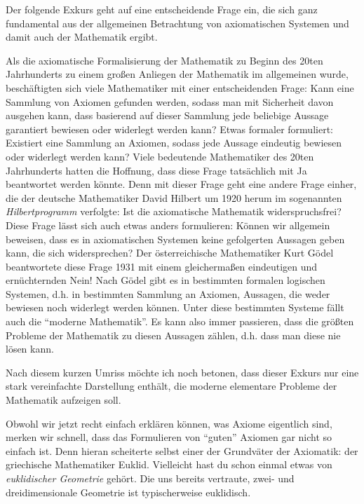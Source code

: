Der folgende Exkurs geht auf eine entscheidende Frage ein, die sich ganz fundamental aus der allgemeinen Betrachtung von axiomatischen Systemen und damit auch der Mathematik ergibt. 

\begin{exkurs}
    Als die axiomatische Formalisierung der Mathematik zu Beginn des 20ten Jahrhunderts zu einem großen Anliegen der Mathematik im allgemeinen wurde, beschäftigten sich viele Mathematiker mit einer entscheidenden Frage: Kann eine Sammlung von Axiomen gefunden werden, sodass man mit Sicherheit davon ausgehen kann, dass basierend auf dieser Sammlung jede beliebige Aussage garantiert bewiesen oder widerlegt werden kann? Etwas formaler formuliert: Existiert eine Sammlung an Axiomen, sodass jede Aussage eindeutig bewiesen oder widerlegt werden kann? Viele bedeutende Mathematiker des 20ten Jahrhunderts hatten die Hoffnung, dass diese Frage tatsächlich mit Ja beantwortet werden könnte. Denn mit dieser Frage geht eine andere Frage einher, die der deutsche Mathematiker David Hilbert um 1920 herum im sogenannten \textit{Hilbertprogramm} verfolgte: Ist die axiomatische Mathematik widerspruchsfrei? Diese Frage lässt sich auch etwas anders formulieren: Können wir allgemein beweisen, dass es in axiomatischen Systemen keine gefolgerten Aussagen geben kann, die sich widersprechen? Der österreichische Mathematiker Kurt Gödel beantwortete diese Frage 1931 mit einem gleichermaßen eindeutigen und ernüchternden Nein! Nach Gödel gibt es in bestimmten formalen logischen Systemen, d.h. in bestimmten Sammlung an Axiomen, Aussagen, die weder bewiesen noch widerlegt werden können. Unter diese bestimmten Systeme fällt auch die "`moderne Mathematik"'. Es kann also immer passieren, dass die größten Probleme der Mathematik zu diesen Aussagen zählen, d.h. dass man diese nie lösen kann. 

    Nach diesem kurzen Umriss möchte ich noch betonen, dass dieser Exkurs nur eine stark vereinfachte Darstellung enthält, die moderne elementare Probleme der Mathematik aufzeigen soll. 
\end{exkurs}

Obwohl wir jetzt recht einfach erklären können, was Axiome eigentlich sind, merken wir schnell, dass das Formulieren von "`guten"' Axiomen gar nicht so einfach ist. Denn hieran scheiterte selbst einer der Grundväter der Axiomatik: der griechische Mathematiker Euklid. Vielleicht hast du schon einmal etwas von \textit{euklidischer Geometrie} gehört. Die uns bereits vertraute, zwei- und dreidimensionale Geometrie ist typischerweise euklidisch. 

